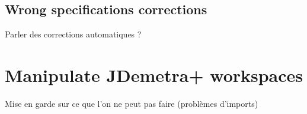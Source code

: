 \documentclass[article]{jss}
\begin{document}
\hypertarget{wrong-specifications-corrections}{%
\subsection{Wrong specifications
corrections}\label{wrong-specifications-corrections}}

Parler des corrections automatiques ?

\hypertarget{manipulate-jdemetra-workspaces}{%
\section{Manipulate JDemetra+
workspaces}\label{manipulate-jdemetra-workspaces}}

Mise en garde sur ce que l'on ne peut pas faire (problèmes d'imports)
\end{document}
